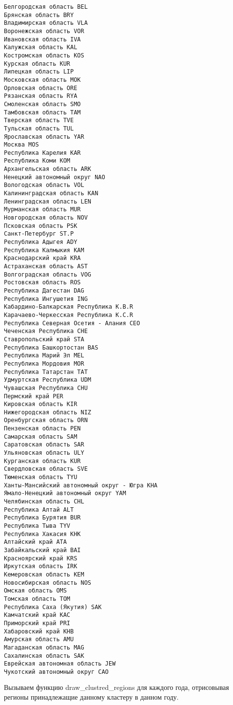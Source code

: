 \documentclass[11pt]{article}
\begin{document}
    \begin{Verbatim}[commandchars=\\\{\}]
Белгородская область BEL
Брянская область BRY
Владимирская область VLA
Воронежская область VOR
Ивановская область IVA
Калужская область KAL
Костромская область KOS
Курская область KUR
Липецкая область LIP
Московская область MOK
Орловская область ORE
Рязанская область RYA
Смоленская область SMO
Тамбовская область TAM
Тверская область TVE
Тульская область TUL
Ярославская область YAR
Москва MOS
Республика Карелия KAR
Республика Коми KOM
Архангельская область ARK
Ненецкий автономный округ NAO
Вологодская область VOL
Калинингpадская область KAN
Ленинградская область LEN
Мурманская область MUR
Новгородская область NOV
Псковская область PSK
Санкт-Петербург ST.P
Республика Адыгея ADY
Республика Калмыкия KAM
Краснодарский край KRA
Астраханская область AST
Волгоградская область VOG
Ростовская область ROS
Республика Дагестан DAG
Республика Ингушетия ING
Кабардино-Балкарская Республика K.B.R
Карачаево-Черкесская Республика K.C.R
Республика Северная Осетия - Алания CEO
Чеченская Республика CHE
Ставропольский край STA
Республика Башкортостан BAS
Республика Марий Эл MEL
Республика Мордовия MOR
Республика Татарстан TAT
Удмуртская Республика UDM
Чувашская Республика CHU
Пермский край PER
Кировская область KIR
Нижегородская область NIZ
Оренбургская область ORN
Пензенская область PEN
Самарская область SAM
Саратовская область SAR
Ульяновская область ULY
Курганская область KUR
Свердловская область SVE
Тюменская область TYU
Ханты-Мансийский автономный округ - Югра KHA
Ямало-Ненецкий автономный округ YAM
Челябинская область CHL
Республика Алтай ALT
Республика Бурятия BUR
Республика Тыва TYV
Республика Хакасия KHK
Алтайский край ATA
Забайкальский край BAI
Красноярский край KRS
Иркутская область IRK
Кемеровская область KEM
Новосибирская область NOS
Омская область OMS
Томская область TOM
Республика Саха (Якутия) SAK
Камчатский край KAC
Приморский край PRI
Хабаровский край KHB
Амурская область AMU
Магаданская область MAG
Сахалинская область SAK
Еврейская автономная область JEW
Чукотский автономный округ CAO

    \end{Verbatim}

    Вызываем функцию draw\_clustred\_regions для каждого года, отрисовывая
регионы принадлежащие данному кластеру в данном году.

    \begin{center}
    \end{center}
    { \hspace*{\fill} \\}
    
\end{document}
